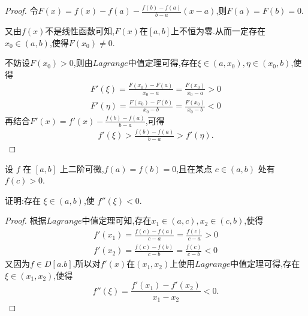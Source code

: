 \documentclass[lang=cn,newtx,10pt,scheme=chinese]{../Template/elegantbook}
\begin{document}
\begin{proof}
    令$F\left( x \right) =f\left( x \right) -f\left( a \right) -\frac{f\left( b \right) -f\left( a \right)}{b-a}\left( x-a \right)$,则$F(a)=F(b)=0$.
    
    又由$f(x)$不是线性函数可知,$F(x)$在$[a,b]$上不恒为零.从而一定存在$x_0\in(a,b)$,使得$F(x_0)\ne0$.
    
    不妨设$F(x_0)>0$,则由$Lagrange$中值定理可得,存在$\xi\in(a,x_0),\eta\in(x_0,b)$,使得
    \begin{gather}
        F'\left( \xi \right) =\frac{F\left( x_0 \right) -F\left( a \right)}{x_0-a}=\frac{F\left( x_0 \right)}{x_0-a}>0
        \nonumber\\
        F'\left( \eta \right) =\frac{F\left( x_0 \right) -F\left( b \right)}{x_0-b}=\frac{F\left( x_0 \right)}{x_0-b}<0        
        \nonumber
    \end{gather}
    再结合$F'(x)=f'(x)-\frac{f\left( b \right) -f\left( a \right)}{b-a}$,可得
    \begin{gather}
        f'(\xi)>\frac{f(b)-f(a)}{b-a}>f'(\eta).
        \nonumber
    \end{gather}

\end{proof}

\begin{exercise}
    设 \( f \) 在 \([a, b]\) 上二阶可微,\( f(a) = f(b) = 0 \),且在某点 \( c \in (a, b) \) 处有 \( f(c) > 0 \).
    
    证明:存在 \(\xi \in (a, b)\),使 \( f''(\xi) < 0 \).    
\end{exercise}
\begin{proof}
    根据$Lagrange$中值定理可知,存在$x_1\in(a,c),x_2\in(c,b)$,使得
    \begin{gather}
        f'\left( x_1 \right) =\frac{f\left( c \right) -f\left( a \right)}{c-a}=\frac{f\left( c \right)}{c-a}>0
        \nonumber\\
        f'\left( x_2 \right) =\frac{f\left( c \right) -f\left( b \right)}{c-b}=\frac{f\left( c \right)}{c-b}<0
        \nonumber
    \end{gather}
    又因为$f\in D[a.b]$,所以对$f'(x)$在$(x_1,x_2)$上使用$Lagrange$中值定理可得,存在$\xi\in(x_1,x_2)$,使得
    \begin{equation}
        f''\left( \xi \right) =\frac{f\prime\left( x_1 \right) -f\prime\left( x_2 \right)}{x_1-x_2}<0.
        \nonumber
    \end{equation}

\end{proof}
\end{document}
